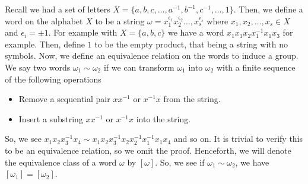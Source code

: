 Recall we had a set of letters \(X = \{a, b, c, \ldots, a^{-1}, b^{-1}, c^{-1}, \ldots,  1 \}\). Then, we define a word on the alphabet \(X\) to be a string \(\omega = x_1^{\epsilon_1} x_2^{\epsilon_2} \ldots, x_{s}^{\epsilon_{s}}\) where \(x_1, x_2, \ldots, x_{s} \in X\) and \(\epsilon _{i} = \pm 1\). For example with \(X = \{a, b, c\} \) we have a word \(x_1 x_1 x_2 x_1^{-1} x_1 x_3\) for example. Then, define \(1\) to be the empty product, that being a string with no symbols. Now, we define an equivalence relation on the words to induce a group.\\
We say two words \(\omega_1 \sim \omega_2\) if we can transform \(\omega_1\) into \(\omega_2\) with a finite sequence of the following operations
\begin{itemize}
	\item Remove a sequential pair \(x x^{-1}\) or \(x^{-1} x\) from the string.
	\item Insert a substring \(x x^{-1}\) or \(x^{-1} x\) into the string.
\end{itemize}
So, we see \(x_1x_2x_3^{-1}x_4 \sim x_1x_2x_3^{-1}x_2x_2^{-1} x_1^{-1} x_1 x_4\) and so on. It is trivial to verify this to be an equivalence relation, so we omit the proof. Henceforth, we will denote the equivalence class of a word \(\omega\) by \(\left[ \omega \right] \). So, we see if \( \omega_1 \sim \omega_2\), we have \(\left[ \omega_1 \right]  = \left[ \omega_2 \right] \).
